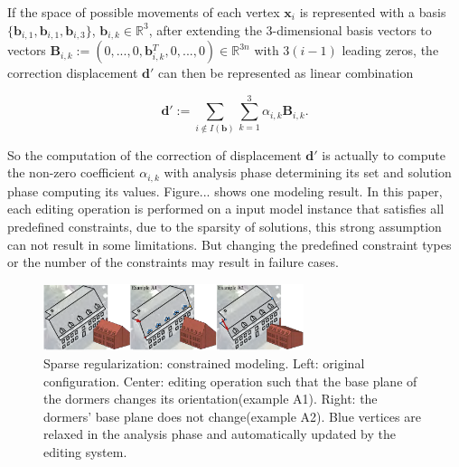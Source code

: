 If the space of possible movements of each vertex $\mathbf{x}_{i}$ is represented with a basis $\{\mathbf{b}_{i,1},\mathbf{b}_{i,1},\mathbf{b}_{i,3}\}$, $\mathbf{b}_{i,k} \in \mathbb{R}^3$, after extending the 3-dimensional basis vectors to vectors $\mathbf{B}_{i,k}:=(0,...,0,\mathbf{b}{_{i,k}^{T}},0,...,0) \in \mathbb{R}^{3n}$ with $3(i-1)$ leading zeros, the correction displacement $\mathbf{d'}$ can then be represented as linear combination

\small{
\begin{equation}
 \label{eq:ConstrainedModeling}
 \mathbf{d'} := \sum_{i\notin I(\mathbf{b})}^{}\sum_{k=1}^{3}\alpha_{i,k}\mathbf{B}_{i,k}.
\end{equation}
}

So the computation of the correction of displacement $\mathbf{d'}$ is actually to compute the non-zero coefficient $\alpha_{i,k}$ with analysis phase determining its set and solution phase computing its values. Figure... shows one modeling result. In this paper, each editing operation is performed on a input model instance that satisfies all predefined constraints, due to the sparsity of solutions, this strong assumption can not result in some limitations. But changing the predefined constraint types or the number of the constraints may result in failure cases.

\begin{figure}[ht]
  \centering
  \includegraphics[width=3in]{images/modeling_L0}
  \caption{Sparse regularization: constrained modeling\cite{habbecke2012linear}. Left: original configuration. Center: editing operation such that the base plane of the dormers changes its orientation(example A1). Right: the dormers' base plane does not change(example A2). Blue vertices are relaxed in the analysis phase and automatically updated by the editing system.}
\end{figure}



